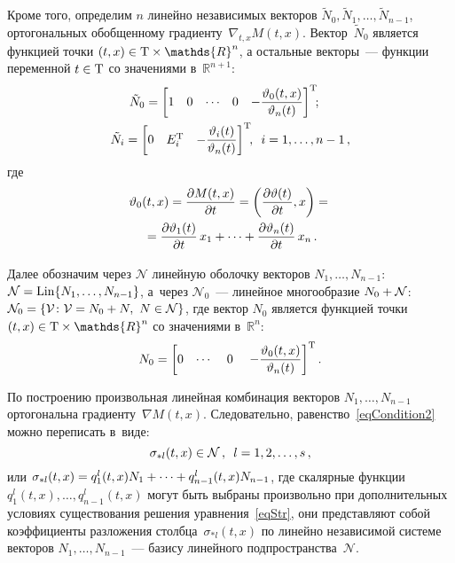 \begin{multicols}{2}
Кроме того, определим $n$ линейно независимых векторов $\tilde N_0, \tilde N_1, \dots, 
\tilde N_{n-1}$, ортогональных обобщенному градиенту~$\nabla_{t,x} M(t,x)$. 
Вектор~$\tilde N_0$ является функцией точки $(t,x) \hm\in \mathrm{T} \times 
\mathds{R}^n$, а остальные векторы~--- функции переменной $t \hm\in \mathrm{T}$ 
со значениями в~$\mathds{R}^{n+1}$:
\begin{multline*}
  \!\!\!\!\!\!\tilde N_0 = \begin{bmatrix} 1 &  0 &  \cdots  & 0 &  
  -\fr{\vartheta_0(t,x)}{\vartheta_n(t)} 
\end{bmatrix}^\trans\!\!; \\
  \tilde N_i = \begin{bmatrix}
   0 &  E_i^\trans &  -\fr{\vartheta_i(t)}{\vartheta_n(t)}  
\end{bmatrix}^\trans\!\!, \enskip  i = 1,\ldots,n-1\,,
\end{multline*}
где
\begin{multline*}
  \vartheta_0(t,x) = \displaystyle\frac{\displaystyle \partial M(t,x)\mathstrut}{\displaystyle \partial t\mathstrut} = \left( 
  \displaystyle\frac{\displaystyle \partial \vartheta(t)\mathstrut}{\displaystyle \partial t\mathstrut},x \right)
  = {}\\
  {}=\displaystyle\frac{\displaystyle \partial \vartheta_1(t)\mathstrut}{\displaystyle \partial t\mathstrut} \, x_1 + \cdots + 
  \displaystyle\frac{\displaystyle \partial \vartheta_n(t)\mathstrut}{\displaystyle \partial t\mathstrut} \, x_n\,.
\end{multline*}

Далее обозначим через $\mathcal{N}$ линейную оболочку векторов $N_1, \ldots, N_{n-1}$: 
$\mathcal{N} \hm= \mathrm{Lin} \{ N_1,\dots,N_{n-1} \}$,
а~через $\mathcal{N}_0$~--- линейное многообразие $N_0\hm + \mathcal{N}$:
 $\mathcal{N}_0 \hm= \{ \mathcal{V} \colon \mathcal{V}\hm = 
N_0\hm + N,\ N \hm\in \mathcal{N} \}$,
где вектор $N_0$ является функцией точки $(t,x)\hm \in \mathrm{T} \times 
\mathds{R}^n$ со значениями в~$\mathds{R}^n$:
$$
  N_0 = \begin{bmatrix} 
   0 & \cdots &~ 0~ & -\displaystyle\frac{\displaystyle \vartheta_0(t,x)\mathstrut}{\displaystyle \vartheta_n(t)\mathstrut} \end{bmatrix}^{{\mathrm{T}}}.
$$

По построению произвольная линейная комбинация векторов $N_1, \ldots, N_{n-1}$ 
ортогональна градиенту~$\nabla M(t,x)$. Следовательно, равенство~\eqref{eqCondition2} 
можно переписать в~виде:
\begin{equation}\label{eqCondition2Geometry}
  \sigma_{* l}(t,x) \in \mathcal{N}\,,\enskip l = 1,2,\dots,s\,,
\end{equation}
или $\sigma_{* l}(t,x) \hm= q_1^l(t,x) N_1 + \cdots + q_{n-1}^l(t,x) N_{n-1}$, 
где скалярные функции $q_1^l(t,x), \ldots, q_{n-1}^l(t,x)$ 
могут быть выбраны произвольно при дополнительных условиях 
существования решения уравнения~\eqref{eqStr}, они представляют собой коэффициенты 
разложения столбца~$\sigma_{* l}(t,x)$ по линейно независимой сис\-те\-ме 
векторов $N_1, \dots, N_{n-1}$~--- базису линейного подпространства~$\mathcal{N}$.


\end{multicols}
